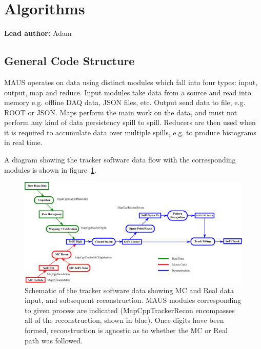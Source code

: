 \section{Algorithms}
\label{Sect:Algo}

{\bf Lead author:} Adam

\subsection{General Code Structure}

MAUS operates on data using distinct modules which fall into four types: input, output, map and reduce. Input modules take data from a source and read into memory e.g. offline DAQ data, JSON files, etc. Output send data to file, e.g. ROOT or JSON. Maps perform the main work on the data, and must not perform any kind of data persistency spill to spill. Reducers are then used when it is required to accumulate data over multiple spills, e.g. to produce histograms in real time.  

A diagram showing the tracker software data flow with the corresponding modules is shown in figure~\ref{Fig:DataFlow}.

\begin{figure}[htb]
    \includegraphics[width=1.0\textwidth]
      {06-Algorithms/Figures/DataFlow.eps}
    \caption{Schematic of the tracker software data showing MC and Real data input, and subsequent reconstruction. MAUS modules corresponding to given process are indicated (MapCppTrackerRecon encompasses all of the reconstruction, shown in blue).  Once digits have been formed, reconstruction is agnostic as to whether the MC or Real path was followed.}
    \label{Fig:DataFlow}
\end{figure}

